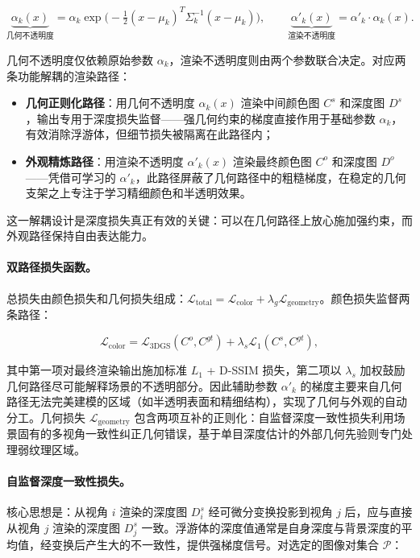 \begin{equation}
\underbrace{\alpha_k(x)}_{\text{几何不透明度}} = \alpha_k \exp\!\bigl(-\tfrac{1}{2}(x-\mu_k)^T\Sigma_k^{-1}(x-\mu_k)\bigr), \qquad
\underbrace{\alpha'_k(x)}_{\text{渲染不透明度}} = \alpha'_k \cdot \alpha_k(x).
\label{eq:02_dual_opacity}
\end{equation}

几何不透明度仅依赖原始参数 $\alpha_k$，渲染不透明度则由两个参数联合决定。对应两条功能解耦的渲染路径：
\begin{itemize}
    \item \textbf{几何正则化路径}：用几何不透明度 $\alpha_k(x)$ 渲染中间颜色图 $C^s$ 和深度图 $D^s$，输出专用于深度损失监督——强几何约束的梯度直接作用于基础参数 $\alpha_k$，有效消除浮游体，但细节损失被隔离在此路径内；
    \item \textbf{外观精炼路径}：用渲染不透明度 $\alpha'_k(x)$ 渲染最终颜色图 $C^o$ 和深度图 $D^o$——凭借可学习的 $\alpha'_k$，此路径屏蔽了几何路径中的粗糙梯度，在稳定的几何支架之上专注于学习精细颜色和半透明效果。
\end{itemize}
这一解耦设计是深度损失真正有效的关键：可以在几何路径上放心施加强约束，而外观路径保持自由表达能力。

\paragraph{双路径损失函数。}总损失由颜色损失和几何损失组成：$\mathcal{L}_{\mathrm{total}} = \mathcal{L}_{\mathrm{color}} + \lambda_g \mathcal{L}_{\mathrm{geometry}}$。颜色损失监督两条路径：

\begin{equation}
\mathcal{L}_{\mathrm{color}} = \mathcal{L}_{\mathrm{3DGS}}(C^o, C^{gt}) + \lambda_s \mathcal{L}_1(C^s, C^{gt}),
\label{eq:02_stable_color}
\end{equation}

其中第一项对最终渲染输出施加标准 $L_1$ + D-SSIM 损失，第二项以 $\lambda_s$ 加权鼓励几何路径尽可能解释场景的不透明部分。因此辅助参数 $\alpha'_k$ 的梯度主要来自几何路径无法完美建模的区域（如半透明表面和精细结构），实现了几何与外观的自动分工。几何损失 $\mathcal{L}_{\mathrm{geometry}}$ 包含两项互补的正则化：自监督深度一致性损失利用场景固有的多视角一致性纠正几何错误，基于单目深度估计的外部几何先验则专门处理弱纹理区域。

\paragraph{自监督深度一致性损失。}核心思想是：从视角 $i$ 渲染的深度图 $D_i^s$ 经可微分变换投影到视角 $j$ 后，应与直接从视角 $j$ 渲染的深度图 $D_j^s$ 一致。浮游体的深度值通常是自身深度与背景深度的平均值，经变换后产生大的不一致性，提供强梯度信号。对选定的图像对集合 $\mathcal{P}$：

